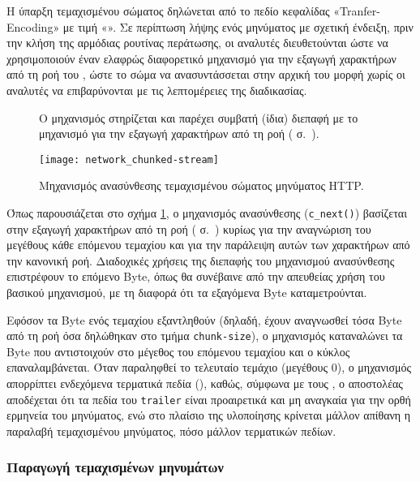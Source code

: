 Η ύπαρξη τεμαχισμένου σώματος δηλώνεται από το πεδίο κεφαλίδας
«Tranfer-Encoding» με τιμή «». Σε περίπτωση λήψης ενός μηνύματος με
σχετική ένδειξη, πριν την κλήση της αρμόδιας ρουτίνας περάτωσης, οι αναλυτές
διευθετούνται ώστε να χρησιμοποιούν έναν ελαφρώς διαφορετικό μηχανισμό για την
εξαγωγή χαρακτήρων από τη ροή του , ώστε το σώμα να ανασυντάσσεται
στην αρχική του μορφή χωρίς οι αναλυτές να επιβαρύνονται με τις λεπτομέρειες της
διαδικασίας.

\begin{figure}
    \caption{Μηχανισμός ανασύνθεσης τεμαχισμένου σώματος μηνύματος HTTP.
    \label{fig:network:chunked-next}}
    Ο μηχανισμός στηρίζεται και παρέχει συμβατή (ίδια) διεπαφή με το μηχανισμό
    για την εξαγωγή χαρακτήρων από τη ροή
    ( σ.~\pageref{ssubsec:network:sbuffer}).
    \begin{center}
    \texttt{[image: network\_chunked-stream]}
    \end{center}
\end{figure}

Όπως παρουσιάζεται στο σχήμα
\ref{fig:network:chunked-next}, ο μηχανισμός ανασύνθεσης (\verb~c_next()~)
βασίζεται στην εξαγωγή χαρακτήρων από τη ροή 
( σ.~\pageref{ssubsec:network:sbuffer}) κυρίως
για την αναγνώριση του μεγέθους κάθε επόμενου τεμαχίου και για την παράλειψη
αυτών των χαρακτήρων από την κανονική ροή. Διαδοχικές χρήσεις της διεπαφής του
μηχανισμού ανασύνθεσης επιστρέφουν το επόμενο Byte, όπως θα συνέβαινε από την
απευθείας χρήση του βασικού μηχανισμού, με τη διαφορά ότι τα εξαγόμενα Byte
καταμετρούνται.

Εφόσον τα Byte ενός τεμαχίου εξαντληθούν (δηλαδή, έχουν αναγνωσθεί τόσα Byte από
τη ροή όσα δηλώθηκαν στο τμήμα \verb~chunk-size~), ο μηχανισμός καταναλώνει τα
Byte που αντιστοιχούν στο μέγεθος του επόμενου τεμαχίου και ο κύκλος
επαναλαμβάνεται. Όταν παραληφθεί το τελευταίο τεμάχιο (μεγέθους 0), ο μηχανισμός
απορρίπτει ενδεχόμενα τερματικά πεδία (), καθώς, σύμφωνα με τους
\textcite[26]{rfc2616}, ο αποστολέας αποδέχεται ότι τα πεδία του \verb~trailer~
είναι προαιρετικά και μη αναγκαία για την ορθή ερμηνεία του μηνύματος, ενώ στο
πλαίσιο της υλοποίησης κρίνεται μάλλον απίθανη η παραλαβή τεμαχισμένου
μηνύματος, πόσο μάλλον τερματικών πεδίων.


\subsubsection{Παραγωγή τεμαχισμένων μηνυμάτων}
\label{ssubsec:network:chunked-output}

